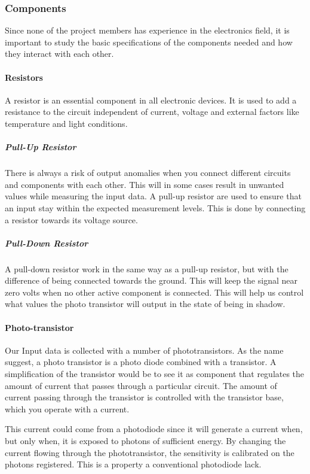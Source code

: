 \documentclass[a4paper,11pt]{article}
\begin{document}


\subsubsection{Components}
Since none of the project members has experience in the electronics field, it is 
important to study the basic specifications of the components needed and how they interact 
with each other. 

\paragraph{Resistors}
A resistor is an essential component in all electronic devices. It is used to add a 
resistance to the circuit independent of current, voltage and external factors like 
temperature and light conditions.

\subparagraph{Pull-Up Resistor}
There is always a risk of output anomalies when you connect different circuits and 
components with each other. This will in some cases result in unwanted values while 
measuring the input data.  A pull-up resistor are used to ensure that an input stay 
within the expected measurement levels. This is done by connecting a resistor towards 
its voltage source.

\subparagraph{Pull-Down Resistor}
A pull-down resistor work in the same way as a pull-up resistor, but with the 
difference of being  connected towards the ground. This will keep the signal near zero 
volts when no other active component is connected. This will help us control what 
values the photo transistor will output in the state of being in shadow.

\paragraph{Photo-transistor}
Our Input data is collected with a number of phototransistors. As the name 
suggest, a photo transistor is a photo diode combined with a transistor.  A 
simplification of the transistor would  be to see it as component that regulates 
the amount of current that passes through a particular circuit. The amount of current 
passing through the transistor is controlled with the transistor base, which you operate
with a current. 

This current could come from a photodiode since it will generate a current when, 
but only when, it is exposed to photons of sufficient energy. By changing the current 
flowing through the phototransistor, the sensitivity is calibrated on the photons 
registered. This is a property a conventional photodiode lack.
\end{document}
